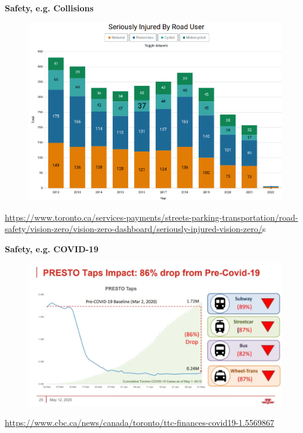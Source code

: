 \documentclass[aspectratio=169]{beamer}
\begin{document}
\begin{frame}
	
	\textbf{Safety, e.g. Collisions}
	
	\begin{figure}
		\centering
		\includegraphics[width=0.7\linewidth]{images/injury_road_tor.png}
	\end{figure}
	
	\tiny \url{https://www.toronto.ca/services-payments/streets-parking-transportation/road-safety/vision-zero/vision-zero-dashboard/seriously-injured-vision-zero/}s
	
\end{frame}




\begin{frame}
	
	\textbf{Safety, e.g. COVID-19}
	
	\begin{figure}
		\centering
		\includegraphics[width=0.94\linewidth]{images/ttc-covid.png}
	\end{figure}
	
		\tiny \url{https://www.cbc.ca/news/canada/toronto/ttc-finances-covid19-1.5569867}
	
\end{frame}
\end{document}
